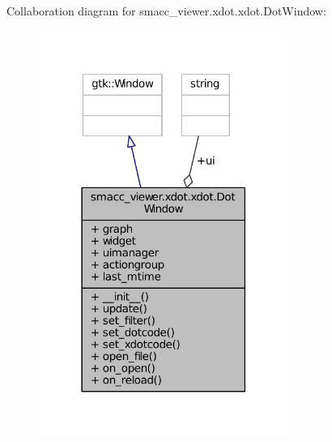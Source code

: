 Collaboration diagram for smacc\+\_\+viewer.\+xdot.\+xdot.\+Dot\+Window\+:
\nopagebreak
\begin{figure}[H]
\begin{center}
\leavevmode
\includegraphics[width=231pt]{classsmacc__viewer_1_1xdot_1_1xdot_1_1DotWindow__coll__graph}
\end{center}
\end{figure}
